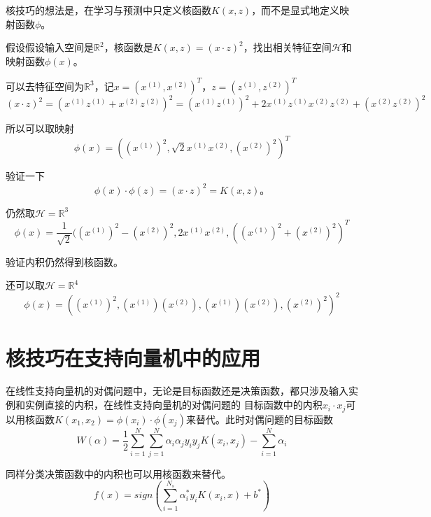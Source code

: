 核技巧的想法是，在学习与预测中只定义核函数$K(x,z)$，而不是显式地定义映射函数$\phi$。

\begin{example}
    假设假设输入空间是$\mathbb{R}^2$，核函数是$K(x,z)=(x\cdot z)^2$，找出相关特征空间$\mathcal{H}$和映射函数$\phi(x)$。
\end{example}

可以去特征空间为$\mathbb{R}^3$，记$x=(x^{(1)},x^{(2)})^T$，$z=(z^{(1)},z^{(2)})^T$
\begin{equation}
    (x\cdot z)^2=(x^{(1)}z^{(1)}+x^{(2)}z^{(2)})^2=(x^{(1)}z^{(1)})^2+2x^{(1)}z^{(1)}x^{(2)}z^{(2)}+(x^{(2)}z^{(2)})^2
\end{equation}

所以可以取映射
\begin{equation}
    \phi(x)=((x^{(1)})^2,\sqrt{2}x^{(1)}x^{(2)},(x^{(2)})^2)^T
\end{equation}

验证一下
\begin{equation}
    \phi(x)\cdot \phi(z)=(x\cdot z)^2=K(x,z)。
\end{equation}

仍然取$\mathcal{H}=\mathbb{R}^3$
\begin{equation}
    \phi(x)=\frac{1}{\sqrt{2}}((x^{(1)})^2-(x^{(2)})^2,
    2x^{(1)}x^{(2)},((x^{(1)})^2+(x^{(2)})^2)^T
\end{equation}

验证内积仍然得到核函数。

还可以取$\mathcal{H}=\mathbb{R}^4$
\begin{equation}
    \phi(x)=((x^{(1)})^2,(x^{(1)})(x^{(2)}),(x^{(1)})(x^{(2)}),(x^{(2)})^2)^2
\end{equation}

\section{核技巧在支持向量机中的应用}

在线性支持向量机的对偶问题中，无论是目标函数还是决策函数，都只涉及输入实例和实例直接的内积，在线性支持向量机的对偶问题的
目标函数中的内积$x_i\cdot x_j$可以用核函数$K(x_1,x_2)=\phi(x_i)\cdot \phi(x_j)$来替代。此时对偶问题的目标函数
\begin{equation}
    W(\alpha)=\frac{1}{2}\sum\limits_{i=1}^{N}\sum\limits_{j=1}^{N} \alpha_i\alpha_jy_iy_jK(x_i,x_j)-\sum\limits_{i=1}^{N}\alpha_i
\end{equation}

同样分类决策函数中的内积也可以用核函数来替代。
\begin{equation}
    f(x)=sign(\sum\limits_{i=1}^{N_s}\alpha^*_iy_iK(x_i,x)+b^*)
\end{equation}

